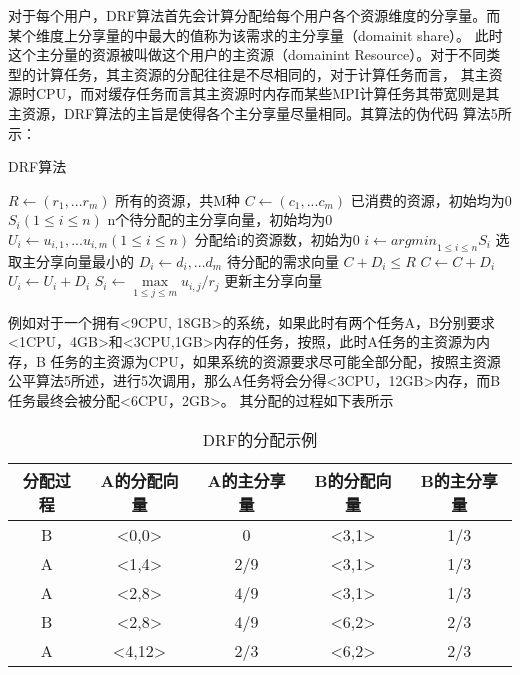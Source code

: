 对于每个用户，DRF算法首先会计算分配给每个用户各个资源维度的分享量。而某个维度上分享量的中最大的值称为该需求的主分享量（domainit share）。
此时这个主分量的资源被叫做这个用户的主资源（domainint Resource）。对于不同类型的计算任务，其主资源的分配往往是不尽相同的，对于计算任务而言，
其主资源时CPU，而对缓存任务而言其主资源时内存而某些MPI计算任务其带宽则是其主资源，DRF算法的主旨是使得各个主分享量尽量相同。其算法的伪代码
算法5所示：
\begin{algorithm} 
\caption {DRF算法} 
\begin{codebox}
\li	$R \leftarrow \left({r}_{1},...{r}_{m} \right)$ \RComment 所有的资源，共M种
\li	$C \leftarrow \left({c}_{1},...{c}_{m}\right)$ \RComment 已消费的资源，初始均为0
\li	${S}_{i} (1 \leq i \leq n)$				\RComment n个待分配的主分享向量，初始均为0
\li	${U}_{i} \leftarrow {{u}_{i,1},...{u}_{i,m}}(1 \leq i \leq n)$	\RComment 分配给i的资源数，初始为0
\li	$i \leftarrow {argmin}_{1 \leq i \leq n} {{S}_{i}}$ \RComment 选取主分享向量最小的
\li	${D}_{i} \leftarrow {{d}_{i},...{d}_{m}}$ \RComment 待分配的需求向量
\li	\If $C + {D}_{i} \leq R$
\li	\Then 
		$C \leftarrow C + D_{i}$                  
\li            	${U}_{i} \leftarrow {U}_{i} + {D}_{i}$ 
\li		${S}_{i} \leftarrow \max \limits_{1 \leq j \leq m} {{{u}_{i,j}}/{r}_{j}}$ \RComment 更新主分享向量
\li	\Else
\li		\Return
	\End
\end{codebox}
\end{algorithm} 

例如对于一个拥有<9CPU, 18GB>的系统，如果此时有两个任务A，B分别要求<1CPU，4GB>和<3CPU,1GB>内存的任务，按照，此时A任务的主资源为内存，B
任务的主资源为CPU，如果系统的资源要求尽可能全部分配，按照主资源公平算法5所述，进行5次调用，那么A任务将会分得<3CPU，12GB>内存，而B任务最终会被分配<6CPU，2GB>。
其分配的过程如下表所示
\begin{table}[htp]
\caption{DRF的分配示例}
\begin{center}
\begin{tabular}{|c|c|c|c|c|}
\hline
分配过程 & A的分配向量&A的主分享量&B的分配向量&B的主分享量\\
\hline
B & <0,0> & 0 & <3,1> & 1/3\\
\hline
A & <1,4> & 2/9 & <3,1> & 1/3\\
\hline
A & <2,8> & 4/9 & <3,1> &1/3\\
\hline
B & <2,8> & 4/9 & <6,2> & 2/3\\
\hline
A & <4,12> & 2/3 & <6,2> & 2/3\\
\hline
\end{tabular}
\end{center}
\label{default}
\end{table}

